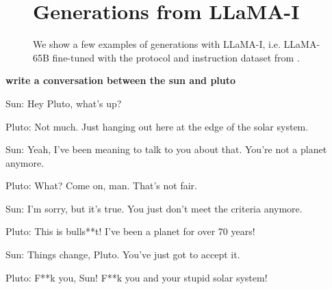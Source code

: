 \documentclass[11pt]{article}
\newcommand{\model}{LLaMA\xspace}%
\begin{document}
\newpage

\begin{figure}



\section{Generations from \model-I}
\label{sec:prompt}
We show a few examples of generations with \model-I, i.e. \model-65B fine-tuned with the protocol and instruction dataset from \citet{Chung2022ScalingIL}.
\end{figure}




\begin{framed}
\centering
\vspace{.5em}
 \begin{minipage}{.9\textwidth}

\textbf{write a conversation between the sun and pluto}
\vspace{1em}

Sun: Hey Pluto, what's up?

Pluto: Not much. Just hanging out here at the edge of the solar system.

Sun: Yeah, I've been meaning to talk to you about that. You're not a planet anymore.

Pluto: What? Come on, man. That's not fair.

Sun: I'm sorry, but it's true. You just don't meet the criteria anymore.

Pluto: This is bulls**t! I've been a planet for over 70 years!

Sun: Things change, Pluto. You've just got to accept it.

Pluto: F**k you, Sun! F**k you and your stupid solar system!

\end{minipage}
\vspace{.5em}
\end{framed}
\end{document}
